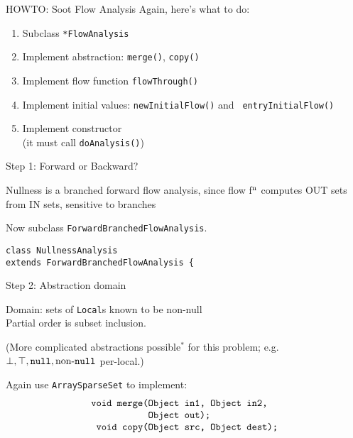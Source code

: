 \begin{slide}{HOWTO: Soot Flow Analysis}
Again, here's what to do:
\begin{enumerate}
\item Subclass \verb+*FlowAnalysis+
\item Implement abstraction: {\tt merge()}, {\tt copy()}
\item Implement flow function {\tt flowThrough()}
\item Implement initial values: {\tt newInitialFlow()} and {\tt
entryInitialFlow()}
\item Implement constructor \\ \quad (it must call {\tt doAnalysis()})
\end{enumerate}
\end{slide}

\begin{slide}{Step 1: Forward or Backward?}

Nullness is a branched forward flow analysis, since flow
f$^{\mbox{\scriptsize n}}$ computes {\sf OUT} sets from {\sf IN} sets, 
sensitive to branches

\qquad

Now subclass {\small \tt \red ForwardBranchedFlowAnalysis}.

\qquad

{\small \red \tt class NullnessAnalysis \\ 
           \qquad extends ForwardBranchedFlowAnalysis \{ }
\end{slide}

\begin{slide}{Step 2: Abstraction domain}
\vspace*{-0.2in}

Domain: sets of {\tt Local}s known to be non-null\\
Partial order is subset inclusion.

\quad
\vspace*{-0.05in}

(More complicated abstractions possible$^{*}$ for this problem; e.g. 
$\perp, \top, \mbox{\tt null}, \mbox{non-{\tt null}}$ per-local.)

\quad
\vspace*{-0.05in}

Again use {\tt ArraySparseSet} to implement:
{\small 
\[ \mbox{\tt \begin{tabular}{r@{}l}
                 void merge(&Object in1, Object in2,\\
                            &Object out);\\
                 void copy(&Object src, Object dest);
\end{tabular}}\]
}

\end{slide}

